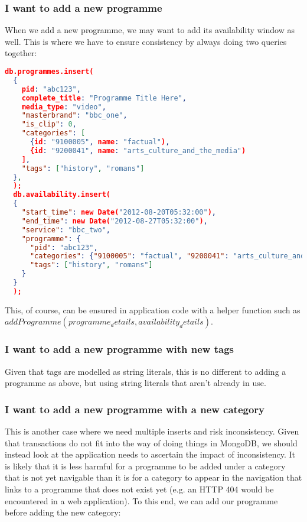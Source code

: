 \documentclass[11pt,a4paper]{article}
\begin{document}
\subsubsection{I want to add a new programme}

When we add a new programme, we may want to add its availability
window as well. This is where we have to ensure consistency by
always doing two queries together:

\begin{lstlisting}[language=json]
  db.programmes.insert(
  {
    pid: "abc123",
    complete_title: "Programme Title Here",
    media_type: "video",
    "masterbrand": "bbc_one",
    "is_clip": 0,
    "categories": [
      {id: "9100005", name: "factual"),
      {id: "9200041", name: "arts_culture_and_the_media")
    ],
    "tags": ["history", "romans"]
  },
  );
  db.availability.insert(
  {
    "start_time": new Date("2012-08-20T05:32:00"),
    "end_time": new Date("2012-08-27T05:32:00"),
    "service": "bbc_two",
    "programme": {
      "pid": "abc123",
      "categories": {"9100005": "factual", "9200041": "arts_culture_and_the_media"},
      "tags": ["history", "romans"]
    }
  }
  );
\end{lstlisting}

This, of course, can be ensured in application code with a helper function
such as $addProgramme(programme_details, availability_details)$.

\subsubsection{I want to add a new programme with new tags}

Given that tags are modelled as string literals, this is no different to adding
a programme as above, but using string literals that aren't already in use.

\subsubsection{I want to add a new programme with a new category}

This is another case where we need multiple inserts and risk inconsistency.
Given that transactions do not fit into the way of doing things in MongoDB,
we should instead look at the application needs to ascertain the impact
of inconsistency. It is likely that it is less harmful for a programme to be
added under a category that is not yet navigable than it is for a category
to appear in the navigation that links to a programme that does not exist yet
(e.g. an HTTP 404 would be encountered in a web application). To this
end, we can add our programme before adding the new category:
\end{document}
